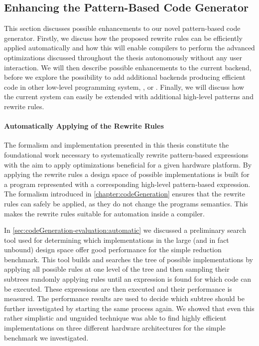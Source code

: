 \subsection{Enhancing the Pattern-Based Code Generator}
\label{section:future-work:codeGenerator}

This section discusses possible enhancements to our novel pattern-based code generator.
Firstly, we discuss how the proposed rewrite rules can be efficiently applied automatically and how this will enable compilers to perform the advanced optimizations discussed throughout the thesis autonomously without any user interaction.
We will then describe possible enhancements to the current \OpenCL backend, before we explore the possibility to add additional backends producing efficient code in other low-level programming system, \eg, \OpenMP or \MPI.
Finally, we will discuss how the current system can easily be extended with additional high-level patterns and rewrite rules.

\paragraph{Automatically Applying of the Rewrite Rules}
The formalism and implementation presented in this thesis constitute the foundational work necessary to systematically rewrite pattern-based expressions with the aim to apply optimizations beneficial for a given hardware platform.
By applying the rewrite rules a design space of possible implementations is built for a program represented with a corresponding high-level pattern-based expression.
The formalism introduced in \autoref{chapter:codeGeneration} ensures that the rewrite rules can safely be applied, as they do not change the programs semantics.
This makes the rewrite rules suitable for automation inside a compiler.

In \autoref{sec:codeGeneration-evaluation:automatic} we discussed a preliminary search tool used for determining which implementations in the large (and in fact unbound) design space offer good performance for the simple reduction benchmark.
This tool builds and searches the tree of possible implementations by applying all possible rules at one level of the tree and then sampling their subtrees randomly applying rules until an expression is found for which \OpenCL code can be executed.
These expressions are then executed and their performance is measured.
The performance results are used to decide which subtree should be further investigated by starting the same process again.
We showed that even this rather simplistic and unguided technique was able to find highly efficient implementations on three different hardware architectures for the simple benchmark we investigated.

